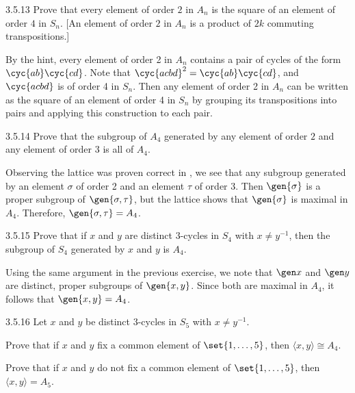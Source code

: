 \begin{exercise}{3.5.13}
    Prove that every element of order $2$ in $A_n$ is the square of an element of order $4$ in $S_n$. [An element of order $2$ in $A_n$ is a product of $2k$ commuting transpositions.]
\end{exercise}

\begin{sol}
    By the hint, every element of order 2 in $A_n$ contains a pair of cycles of the form $\cyc{a b}\cyc{c d}$.
	Note that $\cyc{a c b d}^2 = \cyc{a b}\cyc{c d}$, and $\cyc{a c b d}$ is of order 4 in $S_n$.
	Then any element of order 2 in $A_n$ can be written as the square of an element of order 4 in $S_n$ by grouping its transpositions into pairs and applying this construction to each pair.
\end{sol}

\begin{exercise}{3.5.14}
    Prove that the subgroup of $A_4$ generated by any element of order $2$ and any element of order $3$ is all of $A_4$.
\end{exercise}

\begin{sol}
    Observing the lattice was proven correct in , we see that any subgroup generated by an element $\sigma$ of order 2 and an element $\tau$ of order 3.
	Then $\gen{\sigma}$ is a proper subgroup of $\gen{\sigma, \tau}$, but the lattice shows that $\gen{\sigma}$ is maximal in $A_4$.
	Therefore, $\gen{\sigma, \tau} = A_4$.
\end{sol}

\begin{exercise}{3.5.15}
    Prove that if $x$ and $y$ are distinct $3$-cycles in $S_4$ with $x \ne y^{-1}$, then the subgroup of $S_4$ generated by $x$ and $y$ is $A_4$.
\end{exercise}

\begin{sol}
    Using the same argument in the previous exercise, we note that $\gen x$ and $\gen y$ are distinct, proper subgroups of $\gen{x, y}$.
	Since both are maximal in $A_4$, it follows that $\gen{x, y} = A_4$.
\end{sol}

\begin{exercise}{3.5.16}
    Let $x$ and $y$ be distinct $3$-cycles in $S_5$ with $x\ne y^{-1}$.
    \begin{subexercises}
    \item Prove that if $x$ and $y$ fix a common element of $\set{1,\dots,5}$, then $\langle x,y\rangle \cong A_4$.
    \item Prove that if $x$ and $y$ do not fix a common element of $\set{1,\dots,5}$, then $\langle x,y\rangle = A_5$.
    \end{subexercises}
\end{exercise}

